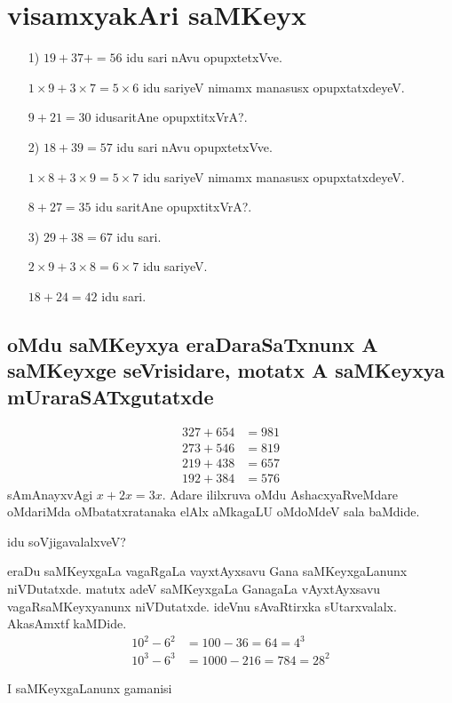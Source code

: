 \chapter{visamxyakAri saMKeyx}

\begin{itemize}
\item[{\rm 1)}] $19+37+ = 56$ idu sari nAvu opupxtetxVve.

$1 \times 9+3 \times 7 = 5 \times 6 $ idu sariyeV nimamx manasusx opupxtatxdeyeV.

$9+21 =30$ idusaritAne opupxtitxVrA?.

\item[{\rm 2)}] $18+39 = 57$ idu sari nAvu opupxtetxVve.

$1 \times 8+3 \times 9 = 5 \times 7 $  idu sariyeV nimamx manasusx opupxtatxdeyeV.

$8 + 27 = 35$ idu saritAne opupxtitxVrA?.

\item[{\rm 3)}] $29 + 38 = 67$ idu sari.

$2\times 9 + 3 \times 8 = 6 \times 7$ idu sariyeV.

$18+24 = 42$ idu sari.
\end{itemize}

\section*{oMdu saMKeyxya eraDaraSaTxnunx A saMKeyxge seVrisidare, motatx A saMKeyxya mUraraSATxgutatxde}
\begin{align*}
327+654 &= 981\\
273+546 &= 819\\
219+438 &= 657\\
192+384 &= 576
\end{align*}
sAmAnayxvAgi $x+2x=3x$. Adare ililxruva oMdu AshacxyaRveMdare oMdariMda oMbatatxratanaka elAlx aMkagaLU oMdoMdeV sala baMdide.

idu soVjigavalalxveV?

eraDu saMKeyxgaLa vagaRgaLa vayxtAyxsavu Gana saMKeyxgaLanunx niVDutatxde. matutx adeV saMKeyxgaLa GanagaLa vAyxtAyxsavu vagaRsaMKeyxyanunx niVDutatxde. ideVnu sAvaRtirxka sUtarxvalalx. AkasAmxtf kaMDide.
\begin{align*}
10^2-6^2 &= 100-36 = 64 = 4^3\\
10^3-6^3 &= 1000-216 = 784 = 28^2
\end{align*}

I saMKeyxgaLanunx gamanisi

